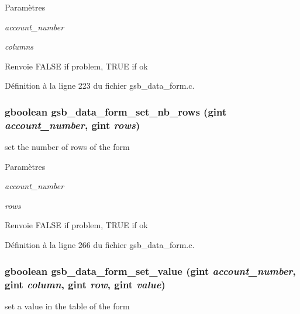 \begin{DoxyParams}{Paramètres}
\item[{\em account\_\-number}]\item[{\em columns}]\end{DoxyParams}
\begin{DoxyReturn}{Renvoie}
FALSE if problem, TRUE if ok 
\end{DoxyReturn}


Définition à la ligne 223 du fichier gsb\_\-data\_\-form.c.

\subsubsection[{gsb\_\-data\_\-form\_\-set\_\-nb\_\-rows}]{\setlength{\rightskip}{0pt plus 5cm}gboolean gsb\_\-data\_\-form\_\-set\_\-nb\_\-rows (gint {\em account\_\-number}, \/  gint {\em rows})}\label{gsb__data__form_8c_aab897602de98433bb719ac14c3181479}
set the number of rows of the form


\begin{DoxyParams}{Paramètres}
\item[{\em account\_\-number}]\item[{\em rows}]\end{DoxyParams}
\begin{DoxyReturn}{Renvoie}
FALSE if problem, TRUE if ok 
\end{DoxyReturn}


Définition à la ligne 266 du fichier gsb\_\-data\_\-form.c.

\subsubsection[{gsb\_\-data\_\-form\_\-set\_\-value}]{\setlength{\rightskip}{0pt plus 5cm}gboolean gsb\_\-data\_\-form\_\-set\_\-value (gint {\em account\_\-number}, \/  gint {\em column}, \/  gint {\em row}, \/  gint {\em value})}\label{gsb__data__form_8c_a3451cf009bc77b47ab207415c06f5039}
set a value in the table of the form



